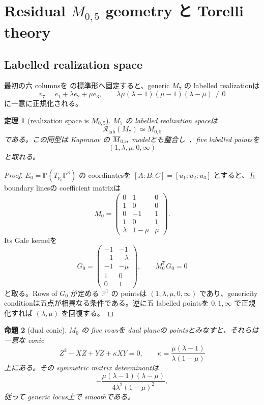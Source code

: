 \documentclass[11pt,a4paper]{ltjsarticle}
\newcommand{\PP}{\mathbb P}\newcommand{\RR}{\mathbb R}\newcommand{\CC}{\mathbb C}
\theoremstyle{plain}
\newtheorem{theorem}{定理}[section]\newtheorem{proposition}[theorem]{命題}
\theoremstyle{definition}
\theoremstyle{remark}
\begin{document}
\section{Residual \texorpdfstring{$M_{0,5}$}{M0,5} geometry と Torelli theory}\label{sec:residual}

\subsection{Labelled realization space}
最初の六 columnsを  の標準形へ固定すると、generic $M_7$ の labelled realizationは
\[
 v_7=e_1+\lambda e_2+\mu e_3,
 \qquad
 \lambda\mu(\lambda-1)(\mu-1)(\lambda-\mu)\ne0
\]
に一意に正規化される。

\begin{theorem}[realization space is $M_{0,5}$]\label{thm:realization-M05}
$M_7$ の labelled realization spaceは
\[
 \mathcal R_{\mathrm{lab}}(M_7)\simeq M_{0,5}
\]
である。この同型は Kapranov の $\overline M_{0,n}$ modelとも整合し~\cite{Kapranov}、five labelled pointsを
\[
 (1,\lambda,\mu,0,\infty)
\]
と取れる。
\end{theorem}

\begin{proof}
$E_0=\PP(T_{p_0}\PP^3)$ の coordinatesを $[A:B:C]=[u_1:u_2:u_3]$ とすると、五 boundary linesの coefficient matrixは
\[
 M_0=
 \begin{pmatrix}
 0&1&0\\
 1&0&0\\
 0&-1&1\\
 1&0&1\\
 \lambda&1-\mu&\mu
 \end{pmatrix}.
\]
Its Gale kernelを
\[
 G_0=
 \begin{pmatrix}
 -1&-1\\
 -1&-\lambda\\
 -1&-\mu\\
 1&0\\
 0&1
 \end{pmatrix},
 \qquad
 M_0^{\mathsf T}G_0=0
\]
と取る。Rows of $G_0$ が定める $\PP^1$ の pointsは $(1,\lambda,\mu,0,\infty)$ であり、genericity conditionは五点が相異なる条件である。逆に五 labelled pointsを $0,1,\infty$ で正規化すれば $(\lambda,\mu)$ を回復する。
\end{proof}

\begin{proposition}[dual conic]\label{prop:dual-conic}
$M_0$ の five rowsを dual planeの pointsとみなすと、それらは一意な conic
\[
 Z^2-XZ+YZ+\kappa XY=0,
 \qquad
 \kappa=\frac{\mu(\lambda-1)}{\lambda(1-\mu)}
\]
上にある。その symmetric matrix determinantは
\[
 -\frac{\mu(\lambda-1)(\lambda-\mu)}{4\lambda^2(1-\mu)^2},
\]
従って generic locus上で smoothである。
\end{proposition}
\end{document}
